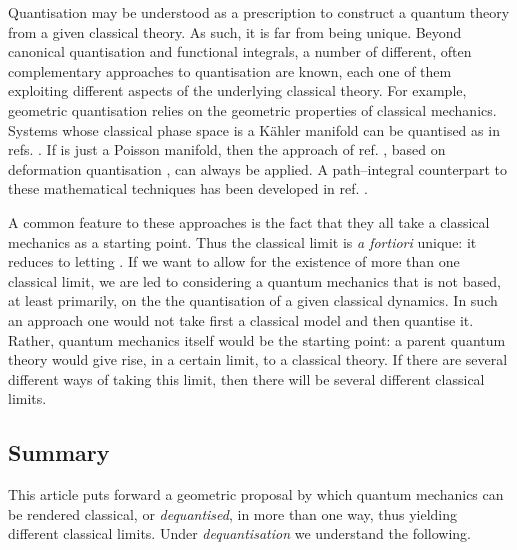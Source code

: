 \documentclass[a4paper,a4paper]{article}
\begin{document}
Quantisation may be understood as a prescription to construct a quantum theory from a given 
classical theory. As such, it is far from being unique. Beyond canonical quantisation 
and functional integrals, a number of  different, often complementary approaches 
to quantisation are known, each one of them exploiting different aspects of the underlying 
classical theory. For example, geometric quantisation \cite{KOSTANT, SOURIAU, 
SNIA, WOODHOUSE} relies on the geometric properties of classical mechanics. 
Systems whose classical phase space 
\coordHE{} is a K\"ahler manifold can be quantised as in refs. \cite{BEREZIN, SCHLICHENMAIER, RT}. 
If \coordHE{} is just a Poisson manifold, then the  approach of ref. \cite{KONTSEVICH}, 
based on deformation quantisation \cite{STERNHEIMER, ZACHOS}, can always  be applied. 
A path--integral counterpart to these mathematical techniques has been developed 
in ref. \cite{CATFELDER}.

A common feature to these approaches is the fact that they all take a classical mechanics 
as a starting point. Thus the classical limit is {\it a fortiori} unique: it reduces to 
letting \coordHE{}. If we want to allow for the existence of more than one classical limit, 
we are led to considering a quantum mechanics that is not based, at least primarily, 
on the the quantisation of a given classical dynamics. In such an approach 
one would not take first a classical model and then quantise it. Rather, 
quantum mechanics itself would be the starting point: a parent quantum theory
would give rise, in a certain limit, to a classical theory. 
If there are several different ways of taking this limit, 
then there will be several different classical limits. 

\subsection{Summary}\label{suma}

This article puts forward a geometric proposal by which quantum mechanics 
can be rendered classical, or {\it dequantised}, in more than one way, 
thus yielding different classical limits. Under {\it dequantisation} 
we understand the following. 
\end{document}

